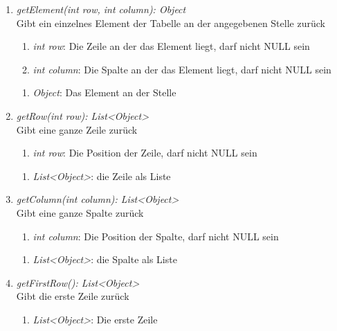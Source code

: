 \begin{enumerate}[+]
	\item \textit{getElement(int row, int column): Object} \\
	Gibt ein einzelnes Element der Tabelle an der angegebenen Stelle zurück
	\begin{enumerate}[$\bullet$]
\item \textit{int row}: Die Zeile an der das Element liegt, darf nicht NULL sein
\item \textit{int column}: Die Spalte an der das Element liegt, darf nicht NULL sein
	\end{enumerate}
	\vspace{-0.2cm}
	\begin{enumerate}[$\circ$]
		\item \textit{Object}: Das Element an der Stelle
	\end{enumerate}
	
	\item \textit{getRow(int row): List<Object>} \\
	Gibt eine ganze Zeile zurück
	\begin{enumerate}[$\bullet$]
		\item \textit{int row}: Die Position der Zeile, darf nicht NULL sein
	\end{enumerate}
	\vspace{-0.2cm}
	\begin{enumerate}[$\circ$]
		\item \textit{List<Object>}: die Zeile als Liste
	\end{enumerate}
	
	\item \textit{getColumn(int column): List<Object>} \\
	Gibt eine ganze Spalte zurück
	
	\begin{enumerate}[$\bullet$]
		\item \textit{int column}: Die Position der Spalte, darf nicht NULL sein
	\end{enumerate}
	\vspace{-0.2cm}
	\begin{enumerate}[$\circ$]
		\item \textit{List<Object>}: die Spalte als Liste
	\end{enumerate}
	
	\item \textit{getFirstRow(): List<Object>} \\
	Gibt die erste Zeile zurück
	\vspace{-0.2cm}
	\begin{enumerate}[$\circ$]
		\item \textit{List<Object>}: Die erste Zeile
	\end{enumerate}


\end{enumerate}
